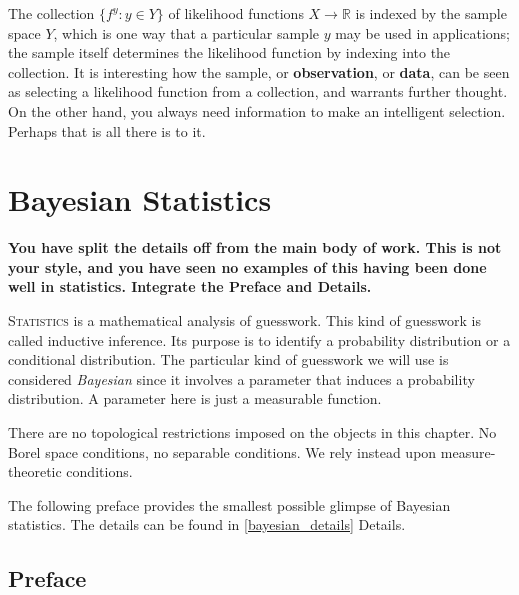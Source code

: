 \documentclass[
twoside=true,
paper=letter,
fontsize=9pt,
pagesize=auto,
leqno,
openany,
headsepline,
overfullrule,
]{scrbook}
\theoremstyle{plain}
\theoremstyle{plain}
\theoremstyle{definition}
\theoremstyle{bfnoteitalic}
\theoremstyle{bfnoteroman}
\newcommand{\term}[1]{\textbf{#1}\index{#1}}
\newcommand{\R}{\mathbb{R}}
\newcommand{\function}{f}
\newcommand{\measurespace}{X}
\newcommand{\measurespaceii}{Y}
\newcommand{\pspace}{\measurespace}%
\newcommand{\sspace}{\measurespaceii}%
\newcommand{\sspaceelt}{y}
\begin{document}
The collection
$\{\function^\sspaceelt:\sspaceelt\in\sspace \}$
of likelihood functions $\pspace\to\R$ is indexed by the sample space
$\sspace$, which is one way that a particular sample $\sspaceelt$ may be used in applications; the sample itself determines the likelihood function by indexing into the collection. It is interesting how the sample, or \term{observation}, or \term{data}, can be seen as selecting a likelihood function from a collection, and warrants further thought. On the other hand, you always need information to make an intelligent selection. Perhaps that is all there is to it.




\chapter{Bayesian Statistics}\label{bayesian_statistics}
\textbf{You have split the details off from the main body of work.  This is not your style, and you have seen no examples of this having been done well in statistics.  Integrate the Preface and Details.}

\lettrine{S}{tatistics} is a mathematical analysis of guesswork. This kind of guesswork is called inductive inference.
Its purpose is to identify a probability distribution or a conditional distribution. The particular kind of guesswork we will use is considered \emph{Bayesian} since it involves a parameter that induces a  probability distribution. A parameter here is just a measurable function.

There are no topological restrictions imposed on the objects in this chapter. No Borel space conditions, no separable conditions.  We rely instead upon measure-theoretic conditions.

The following preface provides the smallest possible glimpse of Bayesian statistics.
The details can be found in \textsf{\ref{bayesian_details} Details}.


\section{Preface}\label{bayesian_preface}
\end{document}
